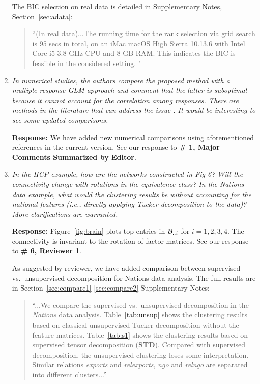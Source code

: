 \documentclass[11pt]{article}
\theoremstyle{plain}
\theoremstyle{definition}
\begin{document}
\begin{enumerate}[wide, labelwidth=!, labelindent=0pt]
    The BIC selection on real data is detailed in Supplementary Notes, Section~\ref{sec:adata}:
    \begin{quote}
         ``(In real data)...The running time for the rank selection via grid search is 95 secs in total, on an iMac macOS High Sierra 10.13.6 with Intel Core i5 3.8 GHz CPU and 8 GB RAM. This indicates the BIC is feasible in the considered setting. "
    \end{quote}
    
    \item \textit{ In numerical studies, the authors compare the proposed method with a multiple-response GLM approach and comment that the latter is suboptimal because it cannot account for the correlation among responses. There are methods in the literature that can address the issue \citep{yee2003reduced, luo2018leveraging}. It would be interesting to see some updated comparisons. }
    
    \textbf{Response:} We have added new numerical comparisons using aforementioned references in the current version. See our response to {\bf \# 1, Major Comments Summarized by Editor}. 
    
    \item \textit{In the HCP example, how are the networks constructed in Fig 6? Will the connectivity change with rotations in the equivalence class? In the Nations data example, what would the clustering results be without accounting for the national features (i.e., directly applying Tucker decomposition to the data)? More clarifications are warranted. } 
    
    \textbf{Response:} Figure~\ref{fig:brain} plots top entries in $\mathcal{B}_{..i}$ for $i=1,2,3,4$. The connectivity is invariant to the rotation of factor matrices. See our response to {\bf \# 6, Reviewer 1}.  
    
    As suggested by reviewer, we have added comparison between supervised vs.\ unsupervised decomposition for  Nations data analysis. The full results are in Section~\ref{sec:compare1}-\ref{sec:compare2} Supplementary Notes:
    \begin{quote}
 ``...We compare the supervised vs.\ unsupervised decomposition in the {\it Nations} data analysis. Table~\ref{tab:unsup} shows the clustering results based on classical unsupervised Tucker decomposition without the feature matrices. Table~\ref{tab:s1} shows the clustering results based on supervised tensor decomposition ({\bf STD}). Compared with supervised decomposition, the unsupervised clustering loses some interpretation. Similar relations {\it exports} and {\it relexports}, {\it ngo} and {\it relngo} are separated into different clusters...''



\end{quote}
\end{enumerate}
\end{document}
